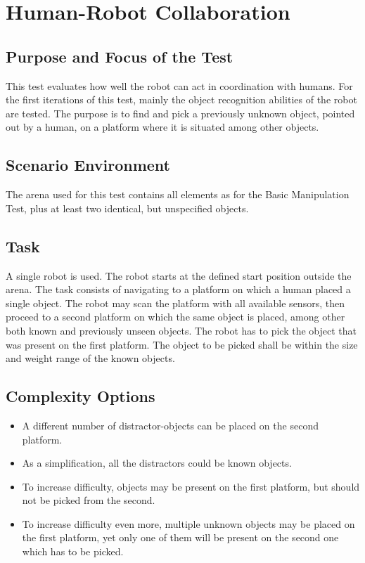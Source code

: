 \newpage
\section{Human-Robot Collaboration}

\subsection{Purpose and Focus of the Test}
This test evaluates how well the robot can act in coordination with humans. For the first iterations of this test, mainly the object recognition abilities of the robot are tested. The purpose is to find and pick a previously unknown object, pointed out by a human, on a platform where it is situated among other objects.


\subsection{Scenario Environment}
The arena used for this test contains all elements as for the Basic Manipulation Test, plus at least two identical, but unspecified objects.

\begin{figure}
\begin{center}
\end{center}
\end{figure}

\subsection{Task}
A single robot is used. The robot starts at the defined start position outside the arena. The task consists of navigating to a platform on which a human placed a single object. The robot may scan the platform with all available sensors, then proceed to a second platform on which the same object is placed, among other both known and previously unseen objects. The robot has to pick the object that was present on the first platform. The object to be picked shall be within the size and weight range of the known {\RCAW} objects.


\subsection{Complexity Options}
\begin{itemize}
\item A different number of distractor-objects can be placed on the second platform.
\item As a simplification, all the distractors could be known {\RCAW} objects.
\item To increase difficulty, {\RCAW} objects may be present on the first platform, but should not be picked from the second.
\item To increase difficulty even more, multiple unknown objects may be placed on the first platform, yet only one of them will be present on the second one which has to be picked.
\end{itemize}

